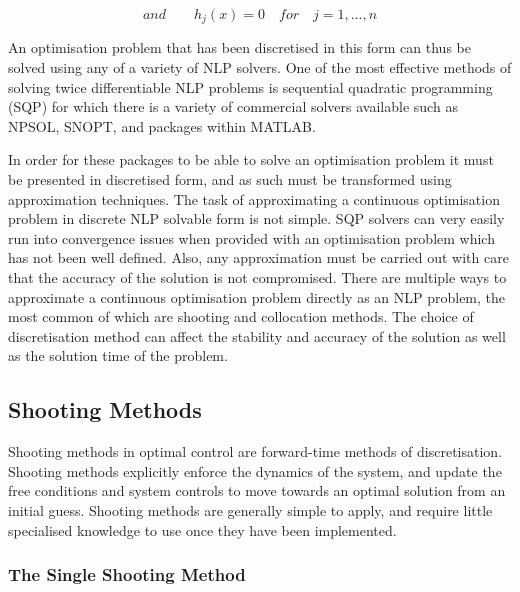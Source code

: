 \begin{equation}
and \qquad h_j(x) = 0 \quad for \quad j=1,...,n
\end{equation}

An optimisation problem that has been discretised in this form can thus be solved using any of a variety of NLP solvers. One of the most effective methods of solving twice differentiable NLP problems is sequential quadratic programming (SQP)\cite{Boggs2000} for which there is a variety of commercial solvers available such as NPSOL, SNOPT, and packages within MATLAB. 

In order for these packages to be able to solve an optimisation problem it must be presented in discretised form, and as such must be transformed using approximation techniques. The task of approximating a continuous optimisation problem in discrete NLP solvable form is not simple. SQP solvers can very easily run into convergence issues when provided with an optimisation problem which has not been well defined. Also, any approximation must be carried out with care that the accuracy of the solution is not compromised. 
There are multiple ways to approximate a continuous optimisation problem directly as an NLP problem, the most common of which are shooting and collocation methods. The choice of discretisation method can affect the stability and accuracy of the solution as well as the solution time of the problem. 

\subsection{Shooting Methods}

Shooting methods in optimal control are forward-time methods of discretisation. Shooting methods explicitly enforce the dynamics of the system, and update the free conditions and system controls to move towards an optimal solution from an initial guess. Shooting methods are generally simple to apply, and require little specialised knowledge to use once they have been implemented. 


\subsubsection{The Single Shooting Method}

